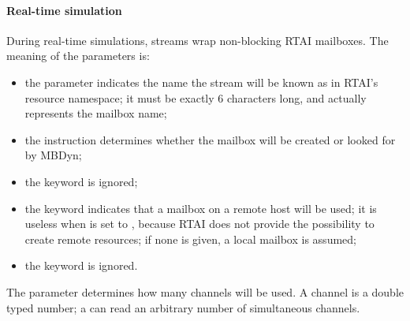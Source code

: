 \paragraph{Real-time simulation}
During real-time simulations, streams wrap non-blocking RTAI mailboxes.
The meaning of the parameters is:
\begin{itemize}
\item the parameter  indicates the name the stream
will be known as in RTAI's resource namespace;
it must be exactly 6 characters long, and actually represents the mailbox name;
\item the instruction  determines whether the mailbox will be
created or looked for by MBDyn;
\item the keyword  is ignored;
\item the keyword  indicates that a mailbox on a remote host 
will be used; it is useless when  is set to , because
RTAI does not provide the possibility to create remote resources;
if none is given, a local mailbox is assumed;
\item the keyword  is ignored.
\end{itemize}

The parameter  determines how many
channels will be used.
A channel is a double typed number; a  can read
an arbitrary number of simultaneous channels.
